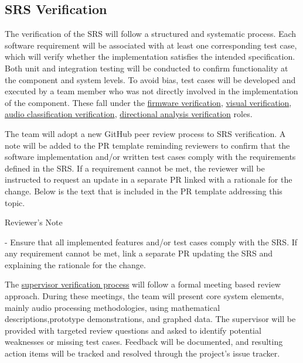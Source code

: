\documentclass[12pt, titlepage]{article}
\newenvironment{shadedquotation}
    {\begin{shaded*}
     \quoting[leftmargin=0pt, vskip=0pt]}
    {\endquoting
     \end{shaded*}}
\begin{document}
\subsection{SRS Verification}\label{sec:srs_verification}

The verification of the SRS will follow a structured and systematic process.
Each software requirement will be associated with at least one corresponding
test case, which will verify whether the
implementation satisfies the intended specification. Both unit and integration
testing will be conducted to confirm functionality at the component and system
levels. To avoid bias, test cases will be developed and executed by a team
member who was not directly involved in the implementation of the component.
These fall under the
\hyperref[role:firmware_verfication]{firmware verification},
\hyperref[role:visual_vnv]{visual verification},
\hyperref[role:classification_verfication]{audio classification verification},
\hyperref[role:directional_verfication]{directional analysis verification}
roles. \newline

The team will adopt a new GitHub peer review process to SRS verification. A 
note will be added to the PR template reminding reviewers to confirm that the
software implementation and/or written test cases comply with the requirements
defined in the SRS. If a requirement cannot be met, the reviewer will be
instructed to request an update in a separate PR linked with a rationale for the
change. Below is the text that is included in the PR template addressing this
topic. \newline

\begin{shadedquotation}
Reviewer's Note

- Ensure that all implemented features and/or test cases comply with the SRS.
If any requirement cannot be met, link a separate PR updating the SRS and
explaining the rationale for the change.
\end{shadedquotation}

The 
\hyperref[role:audio_processing_verification]{supervisor verification process}
will follow a formal meeting based review approach. During these meetings,
the team will present core system elements, mainly audio processing
methodologies, using mathematical descriptions,prototype demonstrations,
and graphed data. The supervisor will be provided with targeted review
questions and asked to identify potential weaknesses or missing test cases.
Feedback will be documented, and resulting action items will be tracked
and resolved through the project's issue tracker. \newline
\end{document}
